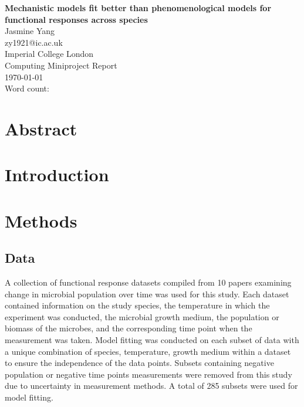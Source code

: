 \documentclass[11pt, a4paper]{article}
\begin{document}
\begin{titlepage}
\begin{center}

\vspace*{4cm}
\Huge{\textbf{Mechanistic models fit better than phenomenological models for functional responses across species}}\\[5mm]
\huge{Jasmine Yang}\\[1mm]
\large{zy1921@ic.ac.uk}\\[3mm]
\Large{Imperial College London}\\

\vspace*{9cm}
\Large{Computing Miniproject Report}\\[3mm]
\today\\[5mm]
\large{Word count: }

\end{center}
\end{titlepage}

\section{Abstract}


\section{Introduction}

\section{Methods}

\subsection{Data}
A collection of functional response datasets compiled from 10 papers examining change in microbial population over time was used for this study. Each dataset contained information on the study species, the temperature in which the experiment was conducted, the microbial growth medium, the population or biomass of the microbes, and the corresponding time point when the measurement was taken. Model fitting was conducted on each subset of data with a unique combination of species, temperature, growth medium within a dataset to ensure the independence of the data points. Subsets containing negative population or negative time points measurements were removed from this study due to uncertainty in measurement methods. A total of 285 subsets were used for model fitting.
 
\end{document}

